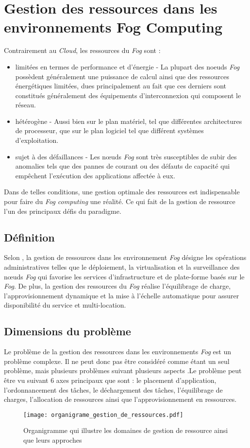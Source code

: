 \section{Gestion des ressources dans les environnements Fog Computing}
Contrairement au \emph{Cloud}, les ressources du \emph{Fog} sont : 
\begin{itemize}
  \item limitées en termes de performance et d'énergie - La plupart des noeuds \emph{Fog} possèdent généralement une  puissance de calcul ainsi que des ressources énergétiques limitées, dues principalement au fait que ces derniers sont constitués généralement des équipements d'interconnexion qui composent le réseau.
  \item hétérogène - Aussi bien sur le plan matériel, tel que différentes architectures de processeur, que sur le plan logiciel tel que différent systèmes d'exploitation.
  \item sujet à des défaillances - Les nœuds \emph{Fog} sont très susceptibles de subir des anomalies tels que des pannes de courant ou des défauts de capacité qui empêchent l'exécution des applications affectée à eux.
\end{itemize}
Dans de telles conditions, une gestion optimale des ressources est indispensable pour faire du \emph{Fog computing} une réalité. Ce qui fait de la gestion de ressource l'un des principaux défis du paradigme.
\subsection{Définition}
Selon \cite{red2020}, la gestion de ressources dans les environnement \emph{Fog} désigne \og{}les opérations administratives telles que le déploiement, la virtualisation et la surveillance des nœuds \emph{Fog} qui favorise les services d'infrastructure et de plate-forme basés sur le \emph{Fog}. De plus, la gestion des ressources du \emph{Fog} réalise l'équilibrage de charge, l'approvisionnement dynamique et la mise à l'échelle automatique pour assurer disponibilité du service et multi-location\fg{}.
\subsection{Dimensions du problème}
Le problème de la gestion des ressources dans les environnements \emph{Fog} est un problème complexe. Il ne peut donc pas être considéré comme étant un seul problème, mais plusieurs problèmes suivant plusieurs aspects
\cite{mos2019}.Le problème peut être vu suivant  6 axes principaux que sont : le placement d'application, l'ordonnancement des tâches, le déchargement des tâches, l'équilibrage de charges, l'allocation de ressources ainsi que l'approvisionnement en ressources.
\begin{figure}[H]
  \centering
  \texttt{[image: organigrame\_gestion\_de\_ressources.pdf]}
  \caption{Organigramme qui illustre les domaines de gestion de ressource ainsi que leurs approches}
  \label{fig:organigrame_de_gestion_de_ressources}
  \end{figure}
